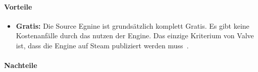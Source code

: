 \paragraph{Vorteile}

\begin{itemize}
    \item \textbf{Gratis:} Die Source Egnine ist grundsätzlich komplett Gratis.
    Es gibt keine Kostenanfälle durch das nutzen der Engine.
    Das einzige Kriterium von Valve ist, dass die Engine auf Steam publiziert werden muss~\cite{Brenna_Hillier_2015}.
\end{itemize}


\paragraph{Nachteile}\label{pgr:cons}

